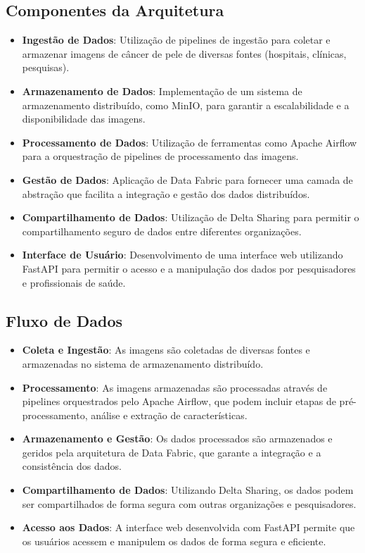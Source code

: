 \subsection{Componentes da Arquitetura}
\begin{itemize}
    \item \textbf{Ingestão de Dados}: Utilização de pipelines de ingestão para coletar e armazenar imagens de câncer de pele de diversas fontes (hospitais, clínicas, pesquisas).
    \item \textbf{Armazenamento de Dados}: Implementação de um sistema de armazenamento distribuído, como MinIO, para garantir a escalabilidade e a disponibilidade das imagens.
    \item \textbf{Processamento de Dados}: Utilização de ferramentas como Apache Airflow para a orquestração de pipelines de processamento das imagens.
    \item \textbf{Gestão de Dados}: Aplicação de Data Fabric para fornecer uma camada de abstração que facilita a integração e gestão dos dados distribuídos.
    \item \textbf{Compartilhamento de Dados}: Utilização de Delta Sharing para permitir o compartilhamento seguro de dados entre diferentes organizações.
    \item \textbf{Interface de Usuário}: Desenvolvimento de uma interface web utilizando FastAPI para permitir o acesso e a manipulação dos dados por pesquisadores e profissionais de saúde.
\end{itemize}

\subsection{Fluxo de Dados}
\begin{itemize}
    \item \textbf{Coleta e Ingestão}: As imagens são coletadas de diversas fontes e armazenadas no sistema de armazenamento distribuído.
    \item \textbf{Processamento}: As imagens armazenadas são processadas através de pipelines orquestrados pelo Apache Airflow, que podem incluir etapas de pré-processamento, análise e extração de características.
    \item \textbf{Armazenamento e Gestão}: Os dados processados são armazenados e geridos pela arquitetura de Data Fabric, que garante a integração e a consistência dos dados.
    \item \textbf{Compartilhamento de Dados}: Utilizando Delta Sharing, os dados podem ser compartilhados de forma segura com outras organizações e pesquisadores.
    \item \textbf{Acesso aos Dados}: A interface web desenvolvida com FastAPI permite que os usuários acessem e manipulem os dados de forma segura e eficiente.
\end{itemize}

